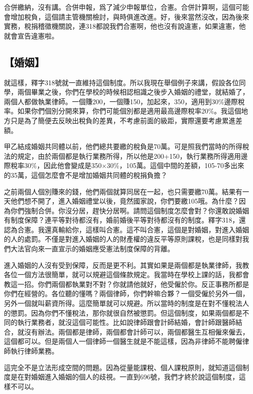 \documentclass[oneside,sub3section]{ctexbook}
\begin{document}
合併繳納，沒有講。合併申報，爲了減少申報單位，合憲。合併計算啊，這個可能會增加稅負，這個請主管機關檢討，與時俱進改進。好，後來當然沒改，因為後來實務，稅捐稽徵機關說，連318都說我們合憲啊，他也沒有說違憲，如果違憲，他就會宣告違憲啦。

\hypertarget{ux5a5aux59fb}{%
\subsection{【婚姻】}\label{ux5a5aux59fb}}

就這樣，釋字318號就一直維持這個制度。所以我現在舉個例子來講，假設各位同學，兩個畢業之後，你們在學校的時候相認相識之後步入婚姻的禮堂，就結婚了，兩個人都做執業律師。一個賺200，一個賺150，加起來，350，適用到30\%邊際稅率。如果你們個別分開來算，你們可能個別都是適用最高邊際稅率20\%。我這個地方只是為了簡便去反映出稅負的差異，不考慮前面的級距，實際還要考慮累進差額。

甲乙結成婚姻共同體以前，他們總共要繳的稅負是70萬。可是照我們當時的所得稅法的規定，由於兩個都是執行業務所得，所以他是200+150，執行業務所得適用邊際稅率30\%，因此他會變成是350×30\%，105萬。這個中間的差額，105-70多出來的35萬，這個怎麼會不是增加婚姻共同體的稅捐負擔？

之前兩個人個別賺來的錢，他們兩個就算同居在一起，也只需要繳70萬。結果有一天他們想不開了，進入婚姻禮堂以後，竟然國家說，你們要繳105哦。為什麼？因為你們強制合併。你沒分居，趕快分居啊。請問這個制度怎麼會對？你還敢說婚姻有制度保障？連平等對待都沒有，婚前婚後平等對待都沒有的制度。釋字318，還認為合憲。我還真輸給你，這樣叫合憲。這不叫合憲，這個是對婚姻，對進入婚姻的人的處罰。不僅是對進入婚姻的人的財產權的違反平等原則課稅，也是同樣對我們大法官向來一直宣示的婚姻應受憲法制度保障的背離。

進入婚姻的人沒有受到保障，反而是更不利。其實如果是兩個都是執業律師，我教各位一個方法很簡單，就可以規避這個條款規定。我當時在學校上課的話，我都會教這一招。你們兩個都執業對不對？你就請他就好，他受僱於你。反正事務所都是你們在經營的。各位聽的懂嗎？兩個律師，你們幹嘛合夥？一個受僱於另外一個，另外一個就叫薪資所得。這麼簡單就可以規避。所以當時的制度是在對不懂稅法人的懲罰。因為你們不懂稅法，那你就很自然被懲罰。但這個制度，如果兩個都是不同的執行業務者，就沒這個可能性。比如說律師跟會計師結婚，會計師跟醫師結合，就沒有辦法。兩個都是律師，兩個都會計師可以，兩個都醫生互相僱來僱去，這個都可以。但是兩個人一個律師一個醫生就是不能這樣，因為非律師不能聘僱律師執行律師業務。

這完全不是立法形成空間的問題。因為從量能課稅、個人課稅原則，就知道這個制度是在對婚姻進入婚姻的個人的歧視。一直到696號，我們才終於說這個制度，這樣不可以。
\end{document}
